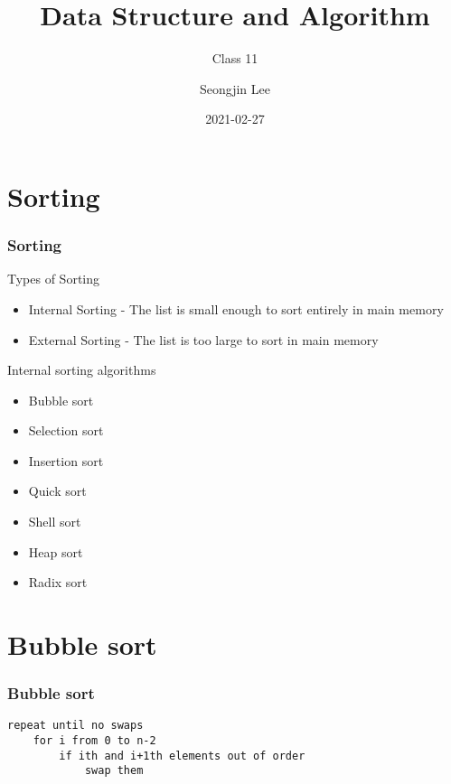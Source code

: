 \documentclass[newPxFont,sthlmFooter,nooffset]{beamer}
\title{Data Structure and Algorithm}
\subtitle{Class 11}
\author[SJL]{Seongjin Lee}
\institute{\href{mailto:insight@gnu.ac.kr}{insight@gnu.ac.kr}\\\url{http://resourceful.github.io}\\Systems Research Lab.\\GNU}
\date{2021-02-27}
\begin{document}
\lstset{basicstyle=\normalsize\ttfamily, language=C}

\frame[plain,t]{\titlepage} 




\section{Sorting}

\begin{frame}[t]
  \frametitle{Sorting}
Types of Sorting
\begin{itemize}
\item Internal Sorting - The list is small enough to sort entirely in main memory
\item External Sorting - The list is too large to sort in main memory
\end{itemize}

Internal sorting algorithms

\begin{itemize}
\item Bubble sort
\item Selection sort
\item Insertion sort
\item Quick sort
\item Shell sort
\item Heap sort
\item Radix sort
\end{itemize}
\end{frame}

\section{Bubble sort}


\begin{frame}[t, fragile]
  \frametitle{Bubble sort}
  \begin{lstlisting}
repeat until no swaps
    for i from 0 to n-2
        if ith and i+1th elements out of order
            swap them
  \end{lstlisting}
\end{frame}
\end{document}

